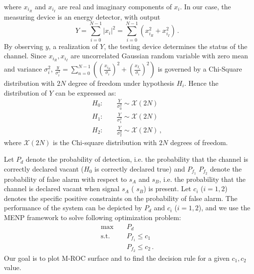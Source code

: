 where $x_{i_R}$ and $x_{i_I}$ are real and imaginary components of $x_i$.
In our case, the measuring device is an energy detector, with output 
\begin{equation} 
  Y = \sum_{i=0}^{N-1}|x_i|^2 = \sum_{i=0}^{N-1}(x_{i_R}^2+x_{i_I}^2)\,.
  \label{equ: testing device}
\end{equation}
By observing $y$, a realization of $Y$, the testing device determines the status of the channel. 
Since $x_{i_R}, x_{i_I}$ are uncorrelated Gaussian random variable with zero mean and variance $\sigma_i^2$, $\frac{y}{\sigma_i^2} = \sum_{n=0}^{N-1}((\frac{x_{i_R}}{\sigma_i})^2 + (\frac{x_{I_i}}{\sigma_i})^2)$ is governed by a Chi-Square distribution with $2N$ degree of freedom under hypothesis $H_i$.
Hence the distribution of $Y$ can be expressed as:
\begin{equation} 
  \label{equ: abstract}
  \begin{split}
	H_0:\;\;\;\;&\frac{Y}{\sigma_0^2}\sim \mathcal{X}(2N)\\
	H_1:\;\;\;\;&\frac{Y}{\sigma_1^2}\sim \mathcal{X}(2N)\\
	H_2:\;\;\;\;&\frac{Y}{\sigma_2^2}\sim \mathcal{X}(2N)\,,
  \end{split}
\end{equation}
where $\mathcal{X}(2N)$ is the Chi-square distribution with $2N$ degrees of freedom. 

Let $P_d$ denote the probability of detection, i.e. the probability that the channel is correctly declared vacant ($H_0$ is correctly declared true) and $P_{f_1}$ $P_{f_2}$ denote the probability of false alarm with respect to $s_A$  and $s_B$, i.e. the probability that the channel is declared vacant when signal $s_A$ ( $s_B$) is present. Let $c_i$ ($i = 1, 2$) denotes the specific positive constraints on the probability of false alarm. The performance of the system can be depicted by $P_d$ and $c_i$ ($i = 1, 2$), and we use the MENP framework to solve following optimization problem:
\begin{equation}
  \begin{split}
	\max\;\;\;\;&P_d\\
	\text{s.t.}\;\;\;\;&P_{f_1}\leq c_1\\
	&P_{f_2} \leq c_2\,.
  \end{split}
  \label{1129a3}
\end{equation}
Our goal is to plot M-ROC surface and to find the decision rule for a given $c_1, c_2$ value.

